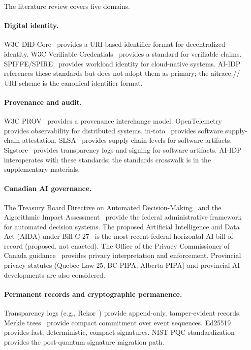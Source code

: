 \documentclass[11pt,a4paper]{article}
\begin{document}
The literature review covers five domains.

\paragraph{Digital identity.} W3C DID Core~\citep{w3cdid2022} provides a URI-based identifier format for decentralized identity. W3C Verifiable Credentials~\citep{w3cvc2022} provides a standard for verifiable claims. SPIFFE/SPIRE~\citep{spiffe2023} provides workload identity for cloud-native systems. AI-IDP references these standards but does not adopt them as primary; the aitrace:// URI scheme is the canonical identifier format.

\paragraph{Provenance and audit.} W3C PROV~\citep{w3cprov2013} provides a provenance interchange model. OpenTelemetry~\citep{opentelemetry2024} provides observability for distributed systems. in-toto~\citep{intoto2021} provides software supply-chain attestation. SLSA~\citep{slsa2023} provides supply-chain levels for software artifacts. Sigstore~\citep{sigstore2023} provides transparency logs and signing for software artifacts. AI-IDP interoperates with these standards; the standards crosswalk is in the supplementary materials.

\paragraph{Canadian AI governance.} The Treasury Board Directive on Automated Decision-Making~\citep{tbdirective2024} and the Algorithmic Impact Assessment~\citep{aia2024} provide the federal administrative framework for automated decision systems. The proposed Artificial Intelligence and Data Act (AIDA) under Bill C-27~\citep{aida2023} is the most recent federal horizontal AI bill of record (proposed, not enacted). The Office of the Privacy Commissioner of Canada guidance~\citep{opc2024} provides privacy interpretation and enforcement. Provincial privacy statutes (Quebec Law 25, BC PIPA, Alberta PIPA) and provincial AI developments are also considered.

\paragraph{Permanent records and cryptographic permanence.} Transparency logs (e.g., Rekor~\citep{rekor2023}) provide append-only, tamper-evident records. Merkle trees~\citep{merkle1987} provide compact commitment over event sequences. Ed25519~\citep{rfc8032} provides fast, deterministic, compact signatures. NIST PQC standardization~\citep{nistpqc2024} provides the post-quantum signature migration path.
\end{document}
